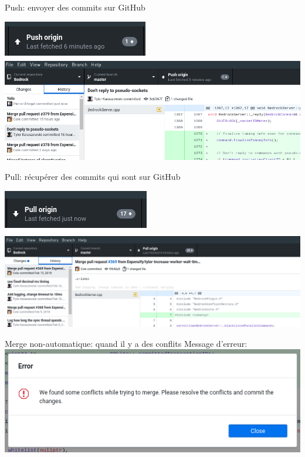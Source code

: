 \documentclass{beamer}
\begin{document}
\begin{frame}{Push: envoyer des commits sur GitHub}
	\begin{center}
	 	   \includegraphics[scale=0.35]{img/github_desktop/push.png}\\
	 	   \includegraphics[scale=0.35]{img/github_desktop/push_2.png}
	\end{center}
\end{frame}

\begin{frame}{Pull: récupérer des commits qui sont sur GitHub}
    
	\begin{center}
	 	   \includegraphics[scale=0.35]{img/github_desktop/pull.png}\\
	 	   \includegraphics[scale=0.35]{img/github_desktop/pull_2.png}
	\end{center}
\end{frame}

\begin{frame}{Merge non-automatique: quand il y a des conflits}
    Message d'erreur:\\
	 	   \includegraphics[scale=0.5]{img/github_desktop/conflit_1.png}
\end{frame}
\end{document}
